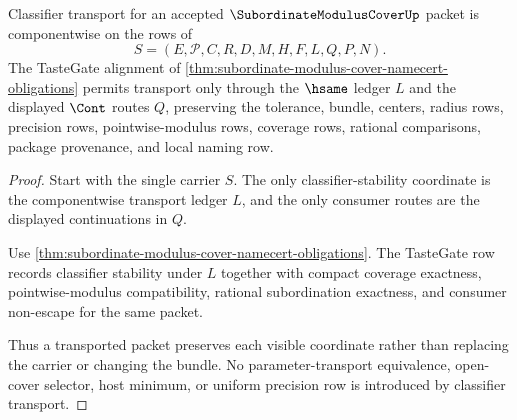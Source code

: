 \begin{theorem}
\label{thm:subordinate-modulus-cover-classifier-stability-obligation}
Classifier transport for an accepted $\SubordinateModulusCoverUp$ packet is componentwise on the rows of
$$
S=(E,\mathcal{P},C,R,D,M,H,F,L,Q,P,N).
$$
The TasteGate alignment of \autoref{thm:subordinate-modulus-cover-namecert-obligations} permits transport only through the $\hsame$ ledger $L$ and the displayed $\Cont$ routes $Q$, preserving the tolerance, bundle, centers, radius rows, precision rows, pointwise-modulus rows, coverage rows, rational comparisons, package provenance, and local naming row.
\end{theorem}
\begin{proof}
Start with the single carrier $S$. The only classifier-stability coordinate is the componentwise transport ledger $L$, and the only consumer routes are the displayed continuations in $Q$.

Use \autoref{thm:subordinate-modulus-cover-namecert-obligations}. The TasteGate row records classifier stability under $L$ together with compact coverage exactness, pointwise-modulus compatibility, rational subordination exactness, and consumer non-escape for the same packet.

Thus a transported packet preserves each visible coordinate rather than replacing the carrier or changing the bundle. No parameter-transport equivalence, open-cover selector, host minimum, or uniform precision row is introduced by classifier transport.
\end{proof}

